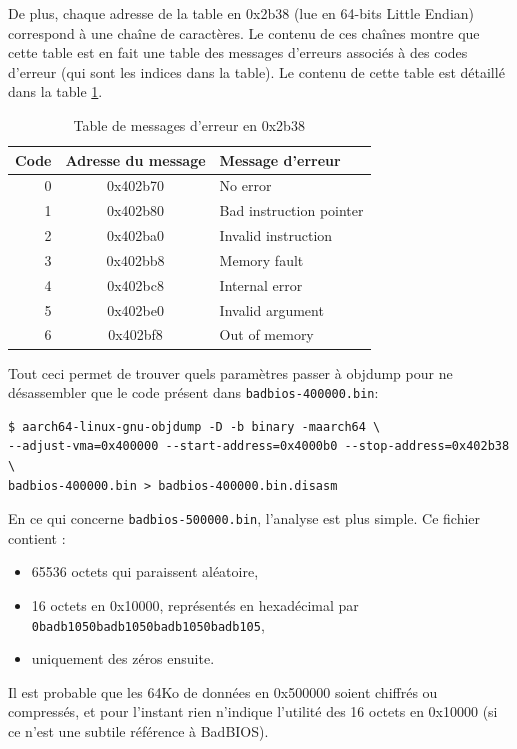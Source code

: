 \documentclass[a4paper,10pt]{article}
\begin{document}
De plus, chaque adresse de la table en 0x2b38 (lue en 64-bits Little Endian) correspond à une chaîne de caractères. Le contenu de ces chaînes montre que cette table est en fait une table des messages d'erreurs associés à des codes d'erreur (qui sont les indices dans la table). Le contenu de cette table est détaillé dans la table \ref{arm64errormessagetable}.

\begin{table}[h]
\begin{center}
\begin{tabular}{|r|c|l|}
  \hline
  Code & Adresse du message & Message d'erreur \\
  \hline
  0 & 0x402b70 & No error \\
  1 & 0x402b80 & Bad instruction pointer \\
  2 & 0x402ba0 & Invalid instruction \\
  3 & 0x402bb8 & Memory fault \\
  4 & 0x402bc8 & Internal error \\
  5 & 0x402be0 & Invalid argument \\
  6 & 0x402bf8 & Out of memory \\
  \hline
\end{tabular}
\end{center}
\caption{Table de messages d'erreur en 0x2b38}
\label{arm64errormessagetable}
\end{table}

Tout ceci permet de trouver quels paramètres passer à objdump pour ne désassembler que le code présent dans \texttt{badbios-400000.bin}:
\begin{verbatim}
$ aarch64-linux-gnu-objdump -D -b binary -maarch64 \
--adjust-vma=0x400000 --start-address=0x4000b0 --stop-address=0x402b38 \
badbios-400000.bin > badbios-400000.bin.disasm
\end{verbatim}

En ce qui concerne \texttt{badbios-500000.bin}, l'analyse est plus simple. Ce fichier contient :
\begin{itemize}
\item 65536 octets qui paraissent aléatoire,
\item 16 octets en 0x10000, représentés en hexadécimal par \texttt{0badb1050badb1050badb1050badb105},
\item uniquement des zéros ensuite.
\end{itemize}

Il est probable que les 64Ko de données en 0x500000 soient chiffrés ou compressés, et pour l'instant rien n'indique l'utilité des 16 octets en 0x10000 (si ce n'est une subtile référence à BadBIOS).
\end{document}

